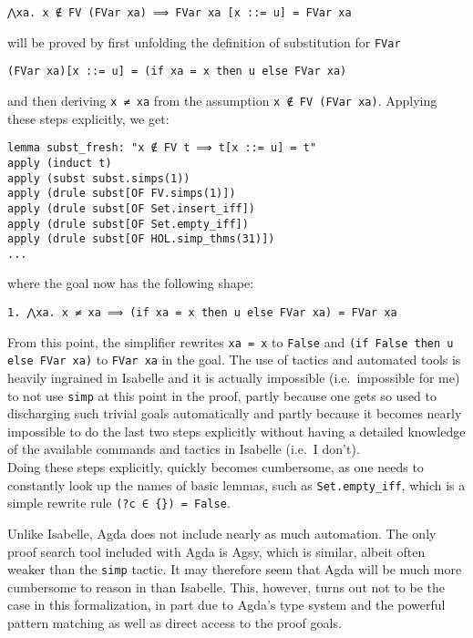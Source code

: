 \documentclass[a4paper, 12pt, twoside]{style/ociamthesis}
\theoremstyle{plain}
\theoremstyle{definition}
\theoremstyle{remark}
\begin{document}
\begin{verbatim}
⋀xa. x ∉ FV (FVar xa) ⟹ FVar xa [x ::= u] = FVar xa
\end{verbatim}

will be proved by first unfolding the definition of substitution for
\texttt{FVar}

\begin{verbatim}
(FVar xa)[x ::= u] = (if xa = x then u else FVar xa)
\end{verbatim}

and then deriving \texttt{x ≠ xa} from the assumption
\texttt{x ∉ FV (FVar xa)}. Applying these steps explicitly, we get:

\begin{verbatim}
lemma subst_fresh: "x ∉ FV t ⟹ t[x ::= u] = t"
apply (induct t)
apply (subst subst.simps(1))
apply (drule subst[OF FV.simps(1)])
apply (drule subst[OF Set.insert_iff])
apply (drule subst[OF Set.empty_iff])
apply (drule subst[OF HOL.simp_thms(31)])
...
\end{verbatim}

where the goal now has the following shape:

\begin{verbatim}
1. ⋀xa. x ≠ xa ⟹ (if xa = x then u else FVar xa) = FVar xa
\end{verbatim}

From this point, the simplifier rewrites \texttt{xa = x} to
\texttt{False} and \texttt{(if False then u else FVar xa)} to
\texttt{FVar xa} in the goal. The use of tactics and automated tools is
heavily ingrained in Isabelle and it is actually impossible
(i.e.~impossible for me) to not use \texttt{simp} at this point in the
proof, partly because one gets so used to discharging such trivial goals
automatically and partly because it becomes nearly impossible to do the
last two steps explicitly without having a detailed knowledge of the
available commands and tactics in Isabelle (i.e.~I don't).\\
Doing these steps explicitly, quickly becomes cumbersome, as one needs
to constantly look up the names of basic lemmas, such as
\texttt{Set.empty\_iff}, which is a simple rewrite rule
\texttt{(?c ∈ \{\}) = False}.

Unlike Isabelle, Agda does not include nearly as much automation. The
only proof search tool included with Agda is Agsy, which is similar,
albeit often weaker than the \texttt{simp} tactic. It may therefore seem
that Agda will be much more cumbersome to reason in than Isabelle. This,
however, turns out not to be the case in this formalization, in part due
to Agda's type system and the powerful pattern matching as well as
direct access to the proof goals.
\end{document}
